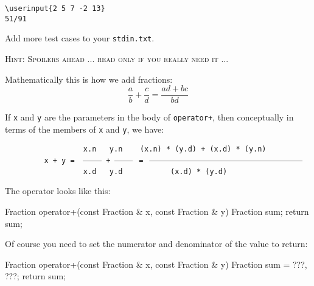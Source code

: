 \nextt
\begin{Verbatim}[frame=single, commandchars=\\\{\}]
\userinput{2 5 7 -2 13}
51/91
\end{Verbatim}

Add more test cases to your \verb!stdin.txt!.

\newpage
\textsc{Hint: Spoilers ahead ... read only if you really need it ...}

Mathematically this is how we add fractions:
\[
  \frac{a}{b} + \frac{c}{d} = \frac{ad + bc}{bd}
\]

If \verb!x! and \verb!y! are the parameters in the body of \verb!operator+!,
then conceptually in terms of the members of \verb!x! and \verb!y!, we have:

\verb!                  x.n   y.n    (x.n) * (y.d) + (x.d) * (y.n)!\\
\verb!         x + y = ! ${\hspace{0.3in}}\over{\hspace{0.3in}}$ \verb!+!
${\hspace{0.3in}}\over{\hspace{0.3in}}$\verb! = !${\hspace{2.5in}}\over{\hspace{2.5in}}$\\
\verb!                  x.d   y.d           (x.d) * (y.d)!

The operator looks like this:
\begin{console}
Fraction operator+(const Fraction & x, const Fraction & y)
{
    Fraction sum;
    return sum;
}
\end{console}

Of course you need to set the numerator and denominator of the value to return:
\begin{console}
Fraction operator+(const Fraction & x, const Fraction & y)
{
    Fraction sum = {???, ???};
    return sum;
}
\end{console}
